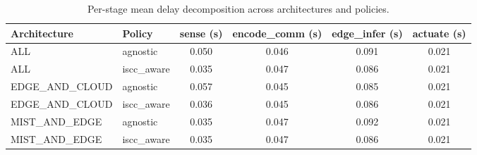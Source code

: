 \begin{table}
\centering
\small
\caption{Per-stage mean delay decomposition across architectures and policies.}
\label{tab:p5-stage-breakdown}
\begin{tabular}{llcccc}
\toprule
Architecture & Policy & sense (s) & encode\_comm (s) & edge\_infer (s) & actuate (s) \\
\midrule
ALL & agnostic & 0.050 & 0.046 & 0.091 & 0.021 \\
ALL & iscc\_aware & 0.035 & 0.047 & 0.086 & 0.021 \\
EDGE\_AND\_CLOUD & agnostic & 0.057 & 0.045 & 0.085 & 0.021 \\
EDGE\_AND\_CLOUD & iscc\_aware & 0.036 & 0.045 & 0.086 & 0.021 \\
MIST\_AND\_EDGE & agnostic & 0.035 & 0.047 & 0.092 & 0.021 \\
MIST\_AND\_EDGE & iscc\_aware & 0.035 & 0.047 & 0.086 & 0.021 \\
\bottomrule
\end{tabular}
\end{table}
